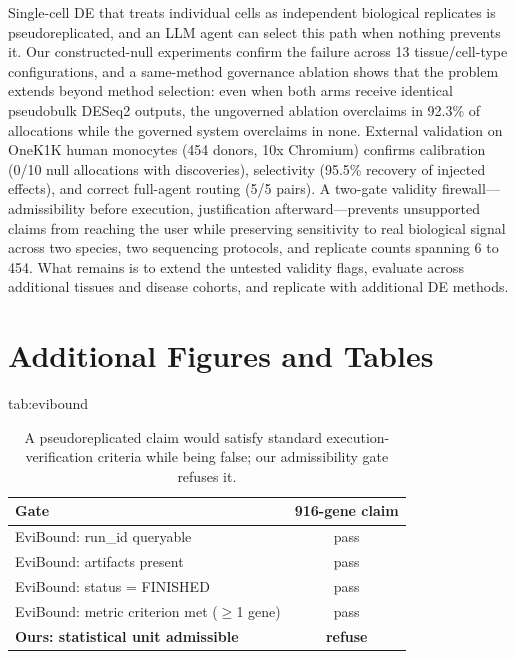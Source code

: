 \documentclass[pmlr,twocolumn,10pt]{jmlr}
\begin{document}
Single-cell DE that treats individual cells as independent biological replicates
is pseudoreplicated, and an LLM agent can select this path when nothing prevents
it. Our constructed-null experiments confirm the failure across 13
tissue/cell-type configurations, and a same-method governance ablation shows
that the problem extends beyond method selection: even when both arms receive
identical pseudobulk DESeq2 outputs, the ungoverned ablation overclaims in
92.3\% of allocations while the governed system overclaims in none. External
validation on OneK1K human monocytes (454 donors, 10x Chromium) confirms
calibration (0/10 null allocations with discoveries), selectivity (95.5\%
recovery of injected effects), and correct full-agent routing (5/5 pairs).
A two-gate validity firewall---admissibility before execution, justification
afterward---prevents unsupported claims from reaching the user while preserving
sensitivity to real biological signal across two species, two sequencing
protocols, and replicate counts spanning 6 to 454.
What remains is to extend the untested validity flags, evaluate across
additional tissues and disease cohorts, and replicate with additional DE
methods.


\newpage


\appendix

\section{Additional Figures and Tables}

\begin{table}[htbp]
\floatconts
  {tab:evibound}
  {\caption{A pseudoreplicated claim would satisfy standard
  execution-verification criteria while being false; our admissibility gate
  refuses it.}}
  {\small
  \begin{tabular}{lc}
  \toprule
  \textbf{Gate} & \textbf{916-gene claim} \\
  \midrule
  EviBound: run\_id queryable & pass \\
  EviBound: artifacts present & pass \\
  EviBound: status = FINISHED & pass \\
  EviBound: metric criterion met ($\geq$1 gene) & pass \\
  \midrule
  \textbf{Ours: statistical unit admissible} & \textbf{refuse} \\
  \bottomrule
  \end{tabular}}
\end{table}
\end{document}
